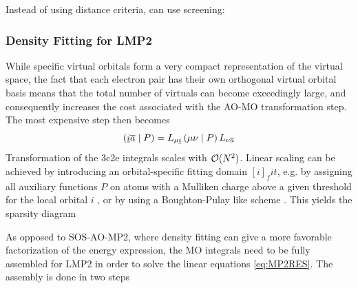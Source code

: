 


Instead of using distance criteria, can use screening: 

\subsubsection{Density Fitting for LMP2}

While specific virtual orbitals form a very compact representation of the virtual space, the fact that each electron pair has their own orthogonal virtual orbital basis means that the total number of virtuals can become exceedingly large, and consequently increases the cost associated with the AO-MO transformation step. The most expensive step then becomes
\begin{equation}
\left( \underline{i}\overline{a} \mid P \right) = L_{\mu\underline{i}} \left( \mu\nu \mid P \right) L_{\nu\overline{a}}
\end{equation}
\noindent Transformation of the 3c2e integrals scales with $\mathcal{O}(N^{2})$. Linear scaling can be achieved by introducing an orbital-specific fitting domain $[i]_fit$, e.g. by assigning all auxiliary functions $P$ on atoms with a Mulliken charge above a given threshold for the local orbital $i$ \cite{Pin2015}, or by using a Boughton-Pulay like scheme \cite{Wer2015}. This yields the sparsity diagram
\begin{center}
\end{center}
\noindent As opposed to SOS-AO-MP2, where density fitting can give a more favorable factorization of the energy expression, the MO integrals need to be fully assembled for LMP2 in order to solve the linear equations \ref{eq:MP2RES}. The assembly is done in two steps
